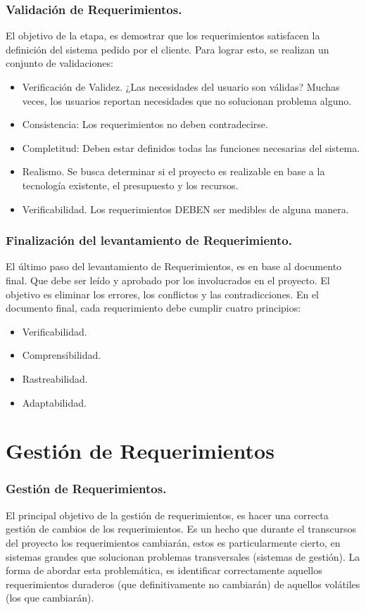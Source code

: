 \documentclass[12pt]{beamer}
\begin{document}
\begin{frame}
\frametitle{Validación de Requerimientos.}
El objetivo de la etapa, es demostrar que los requerimientos satisfacen la definición del sistema pedido por el cliente. Para lograr esto, se realizan un conjunto de validaciones:
\begin{itemize}
 \item Verificación de Validez. ¿Las necesidades del usuario son válidas? Muchas veces, los usuarios reportan necesidades que no solucionan problema alguno.
 \item Consistencia: Los requerimientos no deben contradecirse.
 \item Completitud: Deben estar definidos todas las funciones necesarias del sistema.
 \item Realismo. Se busca determinar si el proyecto es realizable en base a la tecnología existente, el presupuesto y los recursos.
 \item Verificabilidad. Los requerimientos DEBEN ser medibles de alguna manera.
\end{itemize}


\end{frame}


\begin{frame}
\frametitle{Finalización del levantamiento de Requerimiento.}

El último paso del levantamiento de Requerimientos, es en base al documento final. Que debe ser leído y aprobado por los involucrados en el proyecto. El objetivo es eliminar los errores, los conflictos y las contradicciones. En el documento final, cada requerimiento debe cumplir cuatro principios:
\begin{itemize}
 \item Verificabilidad.
 \item Comprensibilidad.
 \item Rastreabilidad.
 \item Adaptabilidad.
\end{itemize}
\end{frame}


\section{Gestión de Requerimientos}
\begin{frame}
\frametitle{Gestión de Requerimientos.}
El principal objetivo de la gestión de requerimientos, es hacer una correcta gestión de cambios de los requerimientos. Es un hecho que durante el transcursos del proyecto los requerimientos cambiarán, estos es particularmente cierto, en sistemas grandes que solucionan problemas transversales (sistemas de gestión).
La forma de abordar esta problemática, es identificar correctamente aquellos requerimientos \alert{duraderos} (que definitivamente no cambiarán) de aquellos \alert{volátiles} (los que cambiarán).
\end{frame}
\end{document}
